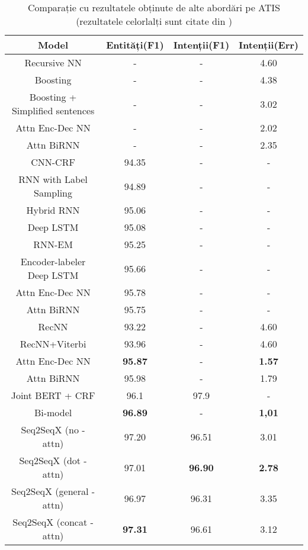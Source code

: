 \begin{table}[htp]
	\small
	\centering
	\begin{tabular}{ c c c c} 
		\hline
		\textbf{Model} 		 & \textbf{Entități(F1)} & \textbf{Intenții(F1)} & \textbf{Intenții(Err)} \\
		\hline
		\hline
		Recursive NN \cite{recursive-nn-intent} & - & - & 4.60 \\
		Boosting \cite{boosting-intent} & - & - & 4.38 \\
		Boosting + Simplified sentences \cite{boostingplus-intent} & - & - & 3.02 \\
		Attn Enc-Dec NN \cite{att_joint_bing} & - & - & 2.02 \\
		Attn BiRNN \cite{att_joint_bing} & - & - & 2.35 \\
		\hline
		\hline
		CNN-CRF \cite{sarika-cnn-crf} & 94.35 & - & - \\
		RNN with Label Sampling \cite{rnn-label-samp} & 94.89 & - & - \\
		Hybrid RNN \cite{mesnil-rnn-crf} & 95.06 & - & - \\
		Deep LSTM \cite{deep-lstm} & 95.08 & - & - \\
		RNN-EM \cite{rnn-em} & 95.25 & - & - \\
		Encoder-labeler Deep LSTM \cite{ecn-deep-lstm} & 95.66 & - & - \\
		Attn Enc-Dec NN \cite{att_joint_bing} & 95.78 & - & - \\
		Attn BiRNN \cite{att_joint_bing} & 95.75 & - & - \\
		\hline
		\hline
		RecNN \cite{recursive-nn-intent} & 93.22 & - & 4.60 \\
		RecNN+Viterbi \cite{recursive-nn-intent} & 93.96 & - & 4.60 \\
		Attn Enc-Dec NN \cite{att_joint_bing} & \textbf{95.87} & - & \textbf{1.57} \\
		Attn BiRNN \cite{att_joint_bing} & 95.98 & - & 1.79 \\
		Joint BERT + CRF \cite{joint-bert} & 96.1 & 97.9 & - \\
		Bi-model \cite{bi-model} & \textbf{96.89} & - & \textbf{1,01} \\
		\hline
		Seq2SeqX (no - attn) & 97.20 & 96.51 & 3.01 \\ %
		Seq2SeqX (dot - attn) & 97.01 & \textbf{96.90} & \textbf{2.78} \\ %
		Seq2SeqX (general - attn) & 96.97 & 96.31 & 3.35 \\ %
		Seq2SeqX (concat - attn) & \textbf{97.31} & 96.61 & 3.12 \\ %
		\hline
	\end{tabular}
	\caption{Comparație cu rezultatele obținute de alte abordări pe ATIS (rezultatele celorlalți sunt citate din \cite{att_joint_bing})}
	\label{rezultate-comp}
\end{table}

